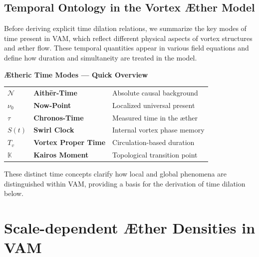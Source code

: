 \subsection*{Temporal Ontology in the Vortex Æther Model}

Before deriving explicit time dilation relations, we summarize the key modes of time present in VAM, which reflect different physical aspects of vortex structures and æther flow. These temporal quantities appear in various field equations and define how duration and simultaneity are treated in the model.

\begin{center}
    \begin{tcolorbox}[colback=gray!10, colframe=black, width=0.9\textwidth, sharp corners=southwest, boxrule=0.5pt]
        \textbf{Ætheric Time Modes — Quick Overview}
        \vspace{0.5em}
        \begin{tabular}{@{}p{1.5cm}p{5.2cm}p{6cm}@{}}
            \(\mathcal{N}\)     & \textbf{Aithēr-Time}         & Absolute causal background \\
            \(\nu_0\)           & \textbf{Now-Point}           & Localized universal present \\
            \(\tau\)            & \textbf{Chronos-Time}        & Measured time in the æther \\
            \(S(t)\)            & \textbf{Swirl Clock}         & Internal vortex phase memory \\
            \(T_v\)             & \textbf{Vortex Proper Time}  & Circulation-based duration \\
            \(\mathbb{K}\)      & \textbf{Kairos Moment}       & Topological transition point \\
        \end{tabular}
    \end{tcolorbox}
    \label{tab:ÆtherTimeModes}
\end{center}
These distinct time concepts clarify how local and global phenomena are distinguished within VAM, providing a basis for the derivation of time dilation below.



\section*{Scale-dependent Æther Densities in VAM}


